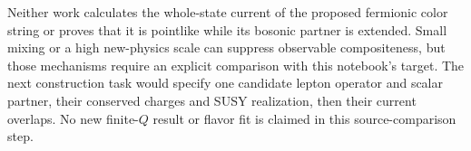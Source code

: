 Neither work calculates the whole-state current of the proposed
fermionic color string or proves that it is pointlike while its
bosonic partner is extended. Small mixing or a high new-physics scale
can suppress observable compositeness, but those mechanisms require
an explicit comparison with this notebook's target. The next
construction task would specify one candidate lepton operator and
scalar partner, their conserved charges and SUSY realization, then
their current overlaps. No new finite-$Q$ result or flavor fit is
claimed in this source-comparison step.
